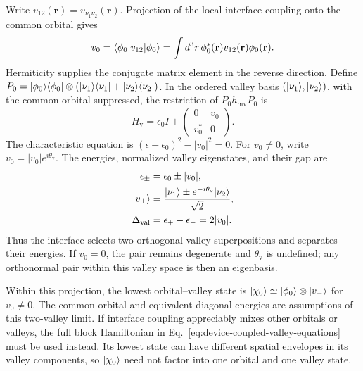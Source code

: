 Write $v_{12}(\mathbf r)=v_{\nu_1\nu_2}(\mathbf r)$.
Projection of the local interface coupling onto the common orbital gives
\begin{equation}
 v_0=\bra{\phi_0}v_{12}\ket{\phi_0}
     =\int d^3r\,\phi_0^*(\mathbf r)
                    v_{12}(\mathbf r)\phi_0(\mathbf r).
 \label{eq:device-valley-projected-coupling}
\end{equation}
Hermiticity supplies the conjugate matrix element in the reverse
direction. Define
$P_0=\lvert \phi_0\rangle\langle \phi_0\rvert\otimes
(\lvert \nu_1\rangle\langle \nu_1\rvert+\lvert \nu_2\rangle\langle \nu_2\rvert)$.
In the ordered valley basis $(\lvert \nu_1\rangle,\lvert \nu_2\rangle)$, with
the common orbital suppressed, the restriction of
$P_0h_{\mathrm{mv}}P_0$ is
\begin{equation}
 H_{\mathrm v}=\epsilon_0 I+
       \begin{pmatrix}0&v_0\\v_0^*&0\end{pmatrix}.
 \label{eq:device-valley-doublet}
\end{equation}
The characteristic equation is
$(\epsilon-\epsilon_0)^2-|v_0|^2=0$.
For $v_0\ne0$, write $v_0=|v_0|e^{i\theta_{\mathrm v}}$.
The energies, normalized valley eigenstates, and their gap are
\begin{equation}
 \begin{aligned}
 \epsilon_\pm&=\epsilon_0\pm|v_0|,\\
 \ket{v_\pm}&=\frac{\ket{\nu_1}
                 \pm e^{-i\theta_{\mathrm v}}\ket{\nu_2}}{\sqrt2},\\
 \Delta_{\mathrm{val}}&=\epsilon_+-\epsilon_-=2|v_0|.
 \end{aligned}
 \label{eq:device-valley-eigenstates}
\end{equation}
Thus the interface selects two orthogonal valley superpositions
and separates their energies. If $v_0=0$, the pair remains
degenerate and $\theta_{\mathrm v}$ is undefined; any orthonormal
pair within this valley space is then an eigenbasis.

Within this projection, the lowest orbital--valley state is
$\lvert \chi_0\rangle\simeq\lvert \phi_0\rangle\otimes\lvert v_-\rangle$ for $v_0\ne0$.
The common orbital and equivalent diagonal energies are assumptions
of this two-valley limit. If interface coupling appreciably mixes
other orbitals or valleys, the full block Hamiltonian in
Eq.~\eqref{eq:device-coupled-valley-equations} must be used instead.
Its lowest state can have different spatial envelopes in its
valley components, so $\lvert \chi_0\rangle$ need not factor into one
orbital and one valley state.

